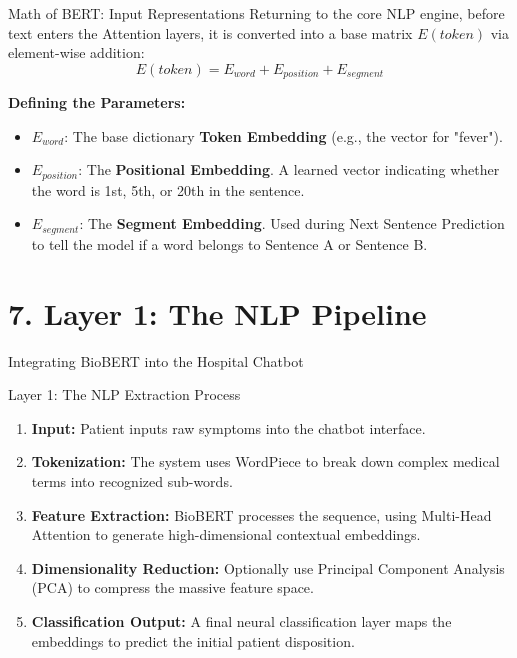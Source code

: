 \documentclass[aspectratio=169]{beamer}
\begin{document}
	\begin{frame}{Math of BERT: Input Representations}
		Returning to the core NLP engine, before text enters the Attention layers, it is converted into a base matrix $E(token)$ via element-wise addition:
		$$E(token) = E_{word} + E_{position} + E_{segment}$$
		
		\textbf{Defining the Parameters:}
		\begin{itemize}
			\item $E_{word}$: The base dictionary \textbf{Token Embedding} (e.g., the vector for "fever").
			\item $E_{position}$: The \textbf{Positional Embedding}. A learned vector indicating whether the word is 1st, 5th, or 20th in the sentence.
			\item $E_{segment}$: The \textbf{Segment Embedding}. Used during Next Sentence Prediction to tell the model if a word belongs to Sentence A or Sentence B.
		\end{itemize}
	\end{frame}
	
	
	
	
	\section{7. Layer 1: The NLP Pipeline}
	
	\begin{frame}{Integrating BioBERT into the Hospital Chatbot}
		\begin{block}{Layer 1: The NLP Extraction Process}
			\begin{enumerate}
				\item \textbf{Input:} Patient inputs raw symptoms into the chatbot interface.
				\item \textbf{Tokenization:} The system uses WordPiece to break down complex medical terms into recognized sub-words.
				\item \textbf{Feature Extraction:} BioBERT processes the sequence, using Multi-Head Attention to generate high-dimensional contextual embeddings.
				\item \textbf{Dimensionality Reduction:} Optionally use Principal Component Analysis (PCA) to compress the massive feature space.
				\item \textbf{Classification Output:} A final neural classification layer maps the embeddings to predict the initial patient disposition.
			\end{enumerate}
		\end{block}
	\end{frame}
	
\end{document}
